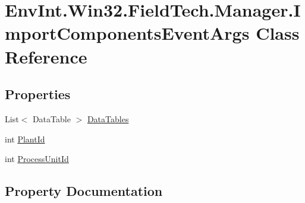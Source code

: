 \hypertarget{class_env_int_1_1_win32_1_1_field_tech_1_1_manager_1_1_import_components_event_args}{}\section{Env\+Int.\+Win32.\+Field\+Tech.\+Manager.\+Import\+Components\+Event\+Args Class Reference}
\label{class_env_int_1_1_win32_1_1_field_tech_1_1_manager_1_1_import_components_event_args}
\subsection*{Properties}
\begin{DoxyCompactItemize}
\item 
List$<$ Data\+Table $>$ \hyperlink{class_env_int_1_1_win32_1_1_field_tech_1_1_manager_1_1_import_components_event_args_a73ba1960cd8694aa42855ec7742a67e2}{Data\+Tables}
\item 
int \hyperlink{class_env_int_1_1_win32_1_1_field_tech_1_1_manager_1_1_import_components_event_args_ac80032595215a3d6b4227b8f8ef37cd8}{Plant\+Id}
\item 
int \hyperlink{class_env_int_1_1_win32_1_1_field_tech_1_1_manager_1_1_import_components_event_args_a6a48076b57f3fbbc5405fe5df74890ff}{Process\+Unit\+Id}
\end{DoxyCompactItemize}


\subsection{Property Documentation}
\hypertarget{class_env_int_1_1_win32_1_1_field_tech_1_1_manager_1_1_import_components_event_args_a73ba1960cd8694aa42855ec7742a67e2}{}
